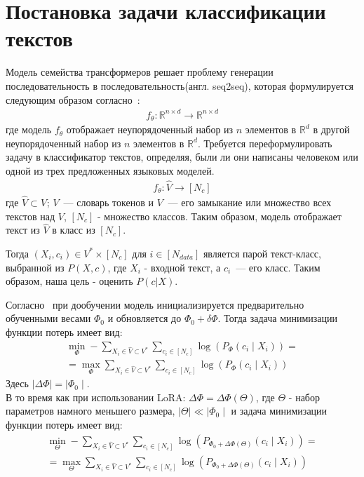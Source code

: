\newpage


\section{Постановка задачи классификации текстов}
Модель семейства трансформеров решает проблему генерации последовательность в последовательность(англ. seq2seq), которая формулируется следующим образом согласно~\cite{thickstun2021transformer}: 
\begin{align}
f_\theta: \mathbb{R}^{n \times d} \rightarrow \mathbb{R}^{n \times d}   
\end{align}
где модель $f_{\theta}$ отображает неупорядоченный набор из $n$ элементов в $\mathbb{R}^{d}$ в другой неупорядоченный набор из $n$ элементов в $\mathbb{R}^{d}$. Требуется переформулировать задачу в классификатор текстов, определяя, были ли они написаны человеком или одной из трех предложенных языковых моделей.
\begin{align}
f_\theta : \hat{V} \rightarrow [N_c]
\end{align}
где $\hat{V} \subset V^{}$; $V$~--- словарь токенов и $V^{}$~--- его замыкание или множество всех текстов над $V$, $[N_c]$ - множество классов. Таким образом, модель отображает текст из $\hat{V}$ в класс из $[N_c]$.

Тогда $(X_i, c_i) \in V^{*} \times [N_c]$ для $i \in [N_{data}]$ является парой текст-класс, выбранной из $P(X, c)$, где $X_i$ - входной текст, а $c_i$~--- его класс. Таким образом, наша цель - оценить $P(c|X)$.

Согласно~\cite{hu2021lora} при дообучении модель инициализируется предварительно обученными весами $\Phi_0$ и обновляется до $\Phi_0 + \delta\Phi$. Тогда задача минимизации функции потерь имеет вид:
\begin{equation}
\label{eq:12} 
\begin{aligned}
\min _{\Phi} -\sum_{X_i \in \hat{V} \subset V^{*}} \sum_{c_i \in [N_c]} \log \left(P_{\Phi}\left(c_i \mid X_i\right)\right) =\\ 
= \max _{\Phi} \sum_{X_i \in \hat{V} \subset V^{*}} \sum_{c_i \in [N_c]} \log \left(P_{\Phi}\left(c_i \mid X_i\right)\right)
\end{aligned}
\end{equation}
Здесь $\mid\Delta\Phi\mid = \mid\Phi_0\mid$.\\ В то время как при использовании LoRA: $\Delta\Phi = \Delta\Phi(\Theta)$, где $\Theta$ - набор параметров намного меньшего размера, $\mid\Theta\mid \ll \mid\Phi_0\mid$ и задача минимизации функции потерь имеет вид:
\begin{equation}
\label{eq:13}
\begin{aligned}
\min _{\Theta} -\sum_{X_i \in \hat{V} \subset V^{*}} \sum_{c_i \in [N_c]} \log \left(P_{\Phi_0+\Delta \Phi(\Theta)}\left(c_i \mid X_i\right)\right) =\\
= \max _{\Theta} \sum_{X_i \in \hat{V} \subset V^{*}} \sum_{c_i \in [N_c]} \log \left(P_{\Phi_0+\Delta \Phi(\Theta)}\left(c_i \mid X_i\right)\right) 
\end{aligned}
\end{equation}


